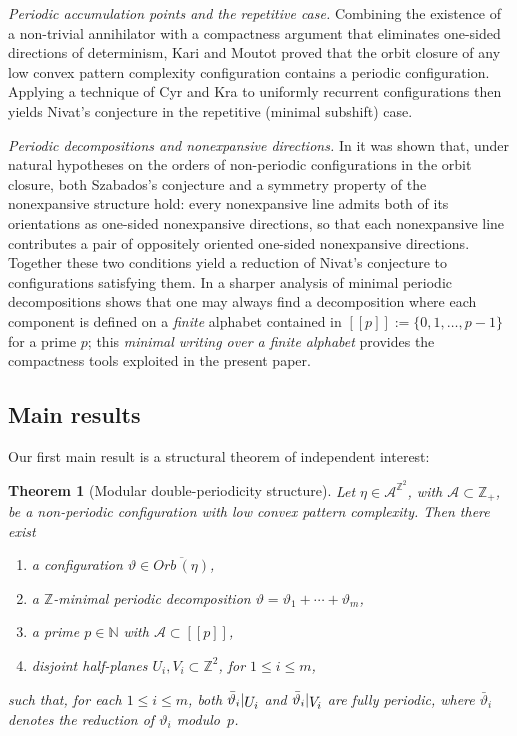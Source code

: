 \documentclass[12pt]{amsart}
\numberwithin{equation}{section}
\newtheorem{theorem}{Theorem}[section]
\newcommand{\sob}[1]{\ensuremath{{\mathbin |}\raise-.4ex\hbox{$#1$}}}
\newcommand{\llb}{[\![}
\newcommand{\rrb}{]\!]}
\begin{document}
\medskip\noindent\textit{Periodic accumulation points and the repetitive case.}
Combining the existence of a non-trivial annihilator \cite{KariSzabados20}
with a compactness argument that eliminates one-sided directions of
determinism, Kari and Moutot \cite{KariMoutot20,KariMoutot21} proved
that the orbit closure of any low convex pattern complexity configuration
contains a periodic configuration.  Applying a technique of Cyr and Kra
\cite{CyrKra15} to uniformly recurrent configurations then yields
Nivat's conjecture in the repetitive (minimal subshift) case.

\medskip\noindent\textit{Periodic decompositions and nonexpansive directions.}
In \cite{Colle23} it was shown that, under natural hypotheses on the
orders of non-periodic configurations in the orbit closure, both
Szabados's conjecture and a symmetry property of the nonexpansive structure hold: 
every nonexpansive line admits both of its orientations as one-sided nonexpansive 
directions, so that each nonexpansive line contributes a pair of oppositely oriented one-sided nonexpansive directions. Together these two conditions yield a reduction of Nivat's 
conjecture to configurations satisfying them.
In \cite{Colle22} a sharper analysis of minimal periodic
decompositions shows that one may always find a decomposition where
each component is defined on a \emph{finite} alphabet contained in
$\llb p\rrb:=\{0,1,\ldots,p-1\}$ for a prime $p$; this
\emph{minimal writing over a finite alphabet} provides the
compactness tools exploited in the present paper.

\subsection{Main results}
\label{subsec:results}

Our first main result is a structural theorem of independent interest:

\begin{theorem}[Modular double-periodicity structure]
\label{thm:modular}
Let $\eta\in\mathcal A^{\mathbb Z^2}$, with $\mathcal A\subset\mathbb Z_+$, be a non-periodic
configuration with low convex pattern complexity.
Then there exist
\begin{enumerate}[label=(\roman*)]
  \item a configuration $\vartheta \in \overline{Orb \, (\eta)}$,
  \item a $\mathbb Z$-minimal periodic decomposition
        $\vartheta=\vartheta_1+\cdots+\vartheta_m$,
  \item a prime $p\in\mathbb N$ with $\mathcal A\subset\llb p \rrb$,
  \item disjoint half-planes $U_i,V_i\subset\mathbb Z^2$, for
        $1\le i\le m$,
\end{enumerate}
such that, for each $1\le i\le m$, both
$\bar\vartheta_i\sob{U_i}$ and $\bar\vartheta_i\sob{V_i}$ are fully
periodic, where $\bar\vartheta_i$ denotes the reduction of $\vartheta_i$
modulo~$p$.
\end{theorem}
\end{document}
